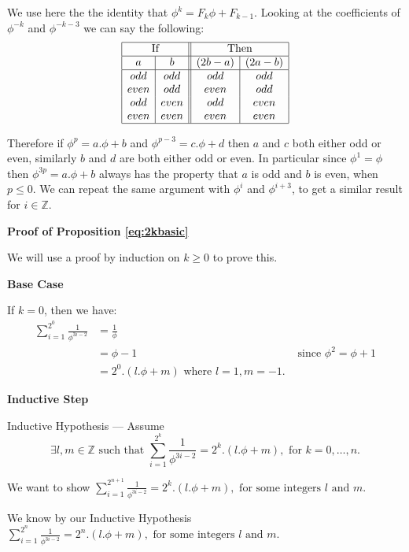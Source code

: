 \documentclass{cs4rep}
\begin{document}
We use here the the identity that $\phi^{k} = F_{k}\phi + F_{k-1}$.
Looking at the coefficients of $\phi^{-k}$ and $\phi^{-k-3}$ we can
say the following:
\[ \begin{array}{|c|c||c|c|}
\hline \multicolumn{2}{|c||}{\mbox{If}} & \multicolumn{2}{c|}{\mbox{Then}} \\
\hline a & b & (2b-a) & (2a-b) \\
\hline odd & odd & odd & odd \\
even & odd & even & odd \\
odd & even & odd & even \\
even & even & even & even \\
\hline
\end{array} \]

Therefore if $\phi^{p} = a.\phi + b$ and $\phi^{p-3} = c.\phi + d$
then $a$ and $c$ both either odd or even, similarly $b$ and $d$ are
both either odd or even. In particular since $\phi^{1}=\phi$ then
$\phi^{3p}=a.\phi+b$ always has the property that $a$ is odd and $b$
is even, when $p \leq 0$. We can repeat the same argument with
$\phi^{i}$ and $\phi^{i+3}$, to get a similar result for $i \in \mathbb{Z} $.

{\bf Proof of Proposition \ref{eq:2kbasic}}

We will use a proof by induction on $k \geq 0$ to prove this.

{\bf Base Case}

If $k=0$, then we have:
\[ \begin{array}{lll}
\sum_{i=1}^{2^{0}} \frac{1}{\phi^{3i-2}} & = \frac{1}{\phi} \\
& = \phi - 1 & \mbox{ since } \phi^{2} = \phi + 1 \\
& = 2^{0}.(l.\phi+m) \mbox{ where } l=1, m=-1.
\end{array} \]

{\bf Inductive Step}

Inductive Hypothesis --- Assume \[ \exists l,m \in \mathbb{Z} \mbox{ such that } \sum_{i=1}^{2^{k}} \frac{1}{\phi^{3i-2}} = 2^{k}.(l.\phi+m), \mbox{ for } k = 0, \ldots , n. \]

We want to show $\sum_{i=1}^{2^{n+1}} \frac{1}{\phi^{3i-2}} = 2^{k}.(l.\phi+m), \mbox{ for some integers } l \mbox{ and } m.$

We know by our Inductive Hypothesis $\sum_{i=1}^{2^{n}} \frac{1}{\phi^{3i-2}} = 2^{n}.(l.\phi+m), \mbox{ for some integers } l \mbox{ and } m.$
\end{document}
